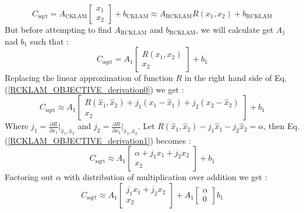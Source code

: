 \begin{equation}
  C_\mathrm{sqrt} = A_\mathrm{CKLAM}\begin{bmatrix} x_1 \\ x_2 \end{bmatrix} + b_\mathrm{CKLAM}\approx A_\mathrm{RCKLAM}R(x_1, x_2) + b_\mathrm{RCKLAM}
	\label{RCKLAM_OBJECTIVE}
\end{equation}
But before attempting to find $A_\mathrm{RCKLAM}$ and $b_\mathrm{RCKLAM}$, we will calculate get $A_1$ nad $b_1$ such that :
\begin{equation}
  C_\mathrm{sqrt} = A_1\begin{bmatrix} R(x_1, x_2) \\ x_2 \end{bmatrix} + b_1
	\label{RCKLAM_OBJECTIVE_derivation0}
\end{equation}
Replacing the linear approximation of function $R$ in the right hand side of Eq.(\ref{RCKLAM_OBJECTIVE_derivation0}) we get : 
\begin{equation}
  C_\mathrm{sqrt}\approx A_1\begin{bmatrix} R(\hat x_1, \hat x_2) + j_1(x_1 - \hat x_1) + j_2(x_2 - \hat x_2) \\ x_2 \end{bmatrix} + b_1
  \label{RCKLAM_OBJECTIVE_derivation1}
\end{equation}
Where $j_1 = \frac{\partial R}{\partial x_1}\biggr\rvert_{\hat x_1, \hat x_2}$ and $j_2 = \frac{\partial R}{\partial x_2}\biggr\rvert_{\hat x_1, \hat x_2}$. Let $R(\hat x_1, \hat x_2) - j_1\hat x_1 - j_2\hat x_2 = \alpha$, then Eq.(\ref{RCKLAM_OBJECTIVE_derivation1}) becomes :
\begin{equation}
  C_\mathrm{sqrt}\approx A_1\begin{bmatrix} \alpha + j_1x_1 + j_2x_2 \\ x_2 \end{bmatrix} + b_1
  \label{RCKLAM_OBJECTIVE_derivation2}
\end{equation}
Factoring out $\alpha$ with distribution of multiplication over addition we get :
\begin{equation}
  C_\mathrm{sqrt}\approx A_1\begin{bmatrix} j_1x_1 + j_2x_2 \\ x_2 \end{bmatrix} + A_1\begin{bmatrix}\alpha \\ 0\end{bmatrix}b_1
  \label{RCKLAM_OBJECTIVE_derivation3}
\end{equation}
